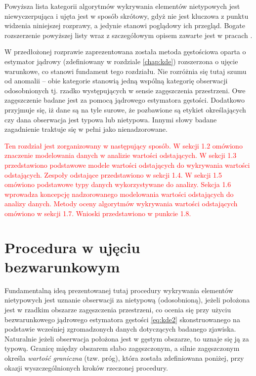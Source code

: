 \documentclass[12pt,a4paper,oneside]{book}
\theoremstyle{definition}
\begin{document}
Powyższa lista kategorii algorytmów wykrywania elementów nietypowych jest niewyczerpująca i ujęta jest w sposób skrótowy, gdyż nie jest kluczowa z punktu widzenia niniejszej rozprawy, a jedynie stanowi poglądowy ich przegląd. Bogate rozszerzenie powyższej listy wraz z szczegółowym opisem zawarte jest w pracach \cite{Aggarwal_2017, Hawkins_1980, Hodge_2004, Rousseeuw_2011}.

W przedłożonej rozprawie zaprezentowana została metoda gęstościowa oparta o estymator jądrowy (zdefiniowany w rozdziale \ref{chap:kde}) rozszerzona o ujęcie warunkowe, co stanowi fundament tego rozdziału. Nie rozróżnia się tutaj szumu od anomalii -- obie kategorie stanowią jedną wspólną kategorię obserwacji odosobnionych tj. rzadko występujących w sensie zagęszczenia przestrzeni. Owe zagęszczenie badane jest za pomocą jądrowego estymatora gęstości. Dodatkowo przyjmuje się, iż dane są na tyle surowe, że pozbawione są etykiet określających czy dana obserwacja jest typowa lub nietypowa. Innymi słowy badane zagadnienie traktuje się w pełni jako nienadzorowane.

\textcolor{red}{Ten rozdział jest zorganizowany w następujący sposób. W sekcji 1.2 omówiono znaczenie modelowania danych w analizie wartości odstających. W sekcji 1.3 przedstawiono podstawowe modele wartości odstających do wykrywania wartości odstających. Zespoły odstające przedstawiono w sekcji 1.4. W sekcji 1.5 omówiono podstawowe typy danych wykorzystywane do analizy. Sekcja 1.6 wprowadza koncepcję nadzorowanego modelowania wartości odstających do analizy danych. Metody oceny algorytmów wykrywania wartości odstających omówiono w sekcji 1.7. Wnioski przedstawiono w punkcie 1.8.}

\section{Procedura w ujęciu bezwarunkowym}  \label{sec:outliers_unconditional_procedure}

Fundamentalną ideą prezentowanej tutaj procedury wykrywania elementów nietypowych jest uznanie obserwacji za nietypową (odosobnioną), jeżeli położona jest w rzadkim obszarze zagęszczenia przestrzeni, co ocenia się przy użyciu bezwarunkowego jądrowego estymatora gęstości \eqref{eq:kde2} skonstruowanego na podstawie wcześniej zgromadzonych danych dotyczących badanego zjawiska. Naturalnie jeżeli obserwacja położona jest w gęstym obszarze, to uznaje się ją za typową. Granicę między obszarem słabo zagęszczonym, a silnie zagęszczonym określa \textit{wartość graniczna} (tzw. próg), która została zdefiniowana poniżej, przy okazji wyszczególnionych kroków rzeczonej procedury.
\end{document}
